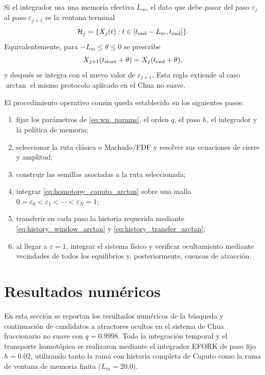 \documentclass[journal]{IEEEtran}
\begin{document}
Si el integrador usa una memoria efectiva $L_m$, el dato que debe pasar del
paso $\varepsilon_j$ al paso $\varepsilon_{j+1}$ es la ventana terminal
\begin{equation}
\label{eq:history_window_arctan}
\mathcal H_j=\{X_j(t):t\in[t_{\rm end}-L_m,t_{\rm end}]\}.
\end{equation}
Equivalentemente, para $-L_m\leq\theta\leq0$ se prescribe
\begin{equation}
\label{eq:history_transfer_arctan}
X_{j+1}(t_{\rm start}+\theta)=X_j(t_{\rm end}+\theta),
\end{equation}
y después se integra con el nuevo valor de $\varepsilon_{j+1}$. Esta regla
extiende al caso $\arctan$ el mismo protocolo aplicado en el Chua no suave.

El procedimiento operativo común queda establecido en los siguientes pasos:
\begin{enumerate}[leftmargin=1.8em,label=\arabic*)]
\item fijar los parámetros de \eqref{eq:wu_params}, el orden $q$, el paso $h$, el integrador y la política de memoria;
\item seleccionar la ruta clásica o Machado/FDF y resolver sus ecuaciones de cierre y amplitud;
\item construir las semillas asociadas a la ruta seleccionada;
\item integrar \eqref{eq:homotopy_caputo_arctan} sobre una malla $0=\varepsilon_0<\varepsilon_1<\cdots<\varepsilon_N=1$;
\item transferir en cada paso la historia requerida mediante \eqref{eq:history_window_arctan} y \eqref{eq:history_transfer_arctan};
\item al llegar a $\varepsilon=1$, integrar el sistema físico y verificar ocultamiento mediante vecindades de todos los equilibrios y, posteriormente, cuencas de atracción.
\end{enumerate}

\section{Resultados numéricos}
\label{sec:resultados_numericos}

En esta sección se reportan los resultados numéricos de la búsqueda y continuación de candidatos a atractores ocultos en el sistema de Chua fraccionario no suave con $q=0.9998$. Toda la integración temporal y el transporte homotópico se realizaron mediante el integrador EFORK de paso fijo $h=0.02$, utilizando tanto la rama con historia completa de Caputo como la rama de ventana de memoria finita ($L_m=20.0$).
\end{document}
